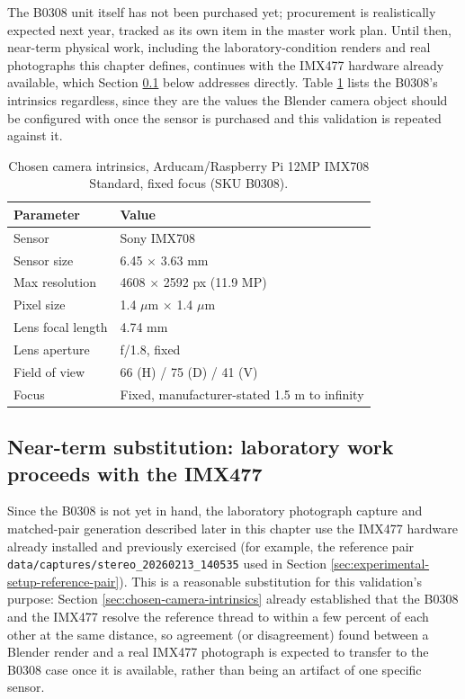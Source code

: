 The B0308 unit itself has not been purchased yet; procurement is realistically expected next year, tracked as its own item in the master work plan. Until then, near-term physical work, including the laboratory-condition renders and real photographs this chapter defines, continues with the IMX477 hardware already available, which Section \ref{sec:chosen-camera-intrinsics-caveat} below addresses directly. Table \ref{tab:chosen-camera-intrinsics} lists the B0308's intrinsics regardless, since they are the values the Blender camera object should be configured with once the sensor is purchased and this validation is repeated against it.

\begin{table}[!ht]
\centering
\small
\caption{Chosen camera intrinsics, Arducam/Raspberry Pi 12MP IMX708 Standard, fixed focus (SKU B0308).}
\label{tab:chosen-camera-intrinsics}
\begin{tabular}{ll}
\toprule
\textbf{Parameter} & \textbf{Value} \\
\midrule
Sensor & Sony IMX708 \\
Sensor size & 6.45 $\times$ 3.63 mm \\
Max resolution & 4608 $\times$ 2592 px (11.9 MP) \\
Pixel size & 1.4 $\mu$m $\times$ 1.4 $\mu$m \\
Lens focal length & 4.74 mm \\
Lens aperture & f/1.8, fixed \\
Field of view & 66\textdegree{} (H) / 75\textdegree{} (D) / 41\textdegree{} (V) \\
Focus & Fixed, manufacturer-stated 1.5 m to infinity \\
\bottomrule
\end{tabular}
\end{table}


\subsection{Near-term substitution: laboratory work proceeds with the IMX477}
\label{sec:chosen-camera-intrinsics-caveat}

Since the B0308 is not yet in hand, the laboratory photograph capture and matched-pair generation described later in this chapter use the IMX477 hardware already installed and previously exercised (for example, the reference pair \texttt{data/captures/stereo\_20260213\_140535} used in Section \ref{sec:experimental-setup-reference-pair}). This is a reasonable substitution for this validation's purpose: Section \ref{sec:chosen-camera-intrinsics} already established that the B0308 and the IMX477 resolve the reference thread to within a few percent of each other at the same distance, so agreement (or disagreement) found between a Blender render and a real IMX477 photograph is expected to transfer to the B0308 case once it is available, rather than being an artifact of one specific sensor.

